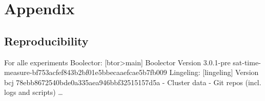 \chapter{Appendix}
\label{chap:appendix}

\section{Reproducibility}
\label{sec:appendix:reproducibility}
For alle experiments
Boolector:
[btor>main] Boolector Version 3.0.1-pre sat-time-measure-bf753acfef843b2bf01e5bbecaaefcae5b7fb009
Lingeling:
[lingeling] Version bcj 78ebb8672540bde0a335aea946bbf32515157d5a
- Cluster data
- Git repos (incl. logs and scripts)
\dots